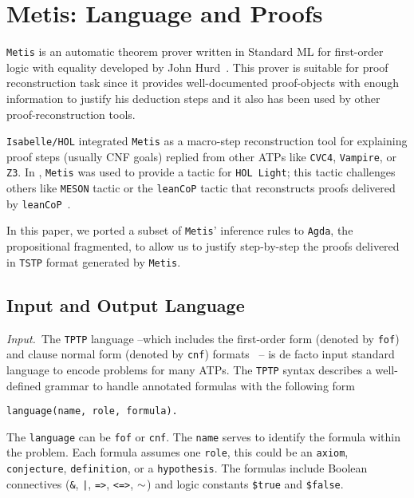 \documentclass[../main.tex]{subfiles}
\begin{document}

\section{Metis: Language and Proofs}
\label{sec:metis-language-and-proofs}

\verb!Metis! is an automatic theorem prover written in Standard ML for
first-order logic with equality developed by John Hurd~\cite{hurd2003first}.
This prover is suitable for proof reconstruction task since it provides
well-documented proof-objects with enough information to justify his deduction
steps and it also has been used by other proof-reconstruction tools.

\verb!Isabelle/HOL! integrated \verb!Metis! as a macro-step reconstruction
tool for explaining proof steps (usually CNF goals) replied from other ATPs like
\verb!CVC4!, \verb!Vampire!, or \verb!Z3!.
In \cite{Farber2015}, \verb!Metis! was used to provide a tactic for
\verb!HOL Light!; this tactic challenges others like \verb!MESON! tactic or the
\verb!leanCoP! tactic that reconstructs proofs delivered by
\verb!leanCoP!~\cite{Farber2016}.

In this paper, we ported a subset of \verb!Metis!' inference rules to \verb!Agda!,
the propositional fragmented, to allow us to justify step-by-step the proofs
delivered in \verb!TSTP! format generated by \verb!Metis!.


\subsection{Input and Output Language}
\label{ssec:input-and-output-language}

\textit{Input.}~The \verb!TPTP! language  --which includes the first-order
form (denoted by \verb!fof!) and clause normal form (denoted by \verb!cnf!)
formats~\cite{sutcliffe2009} -- is de
facto input standard language to encode problems for many ATPs.
The \verb!TPTP! syntax describes a well-defined grammar to handle annotated
formulas with the following form

\begin{verbatim}
language(name, role, formula).
\end{verbatim}

The \verb!language! can be \verb!fof! or \verb!cnf!. The \verb!name!
serves to identify the formula within the problem. Each formula assumes one
\verb!role!, this could be an \verb!axiom!, \verb!conjecture!,
\verb!definition!, or a \verb!hypothesis!. The formulas include Boolean
connectives (\verb!&!, \verb!|!, \verb!=>!, \verb!<=>!, $\tt\sim$) and logic
constants \verb!$true! and \verb!$false!.
\end{document}
